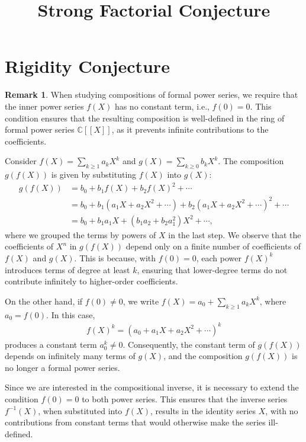 \documentclass[a4paper]{article}
\title{Strong Factorial Conjecture}
\theoremstyle{definition}
\newtheorem*{remark}{Remark}
\begin{document}
\section{Rigidity Conjecture}
\begin{remark}
    When studying compositions of formal power series, we require that the inner power series \(f(X)\) has no constant term, i.e., \(f(0) = 0\). This condition ensures that the resulting composition is well-defined in the ring of formal power series \(\mathbb{C}[[X]]\), as it prevents infinite contributions to the coefficients.

    Consider \(f(X) = \sum_{k \geq 1} a_k X^k\) and \(g(X) = \sum_{k \geq 0} b_k X^k\). The composition \(g(f(X))\) is given by substituting \(f(X)\) into \(g(X)\):
    \begin{align*}
        g(f(X)) &= b_0 + b_1 f(X) + b_2 f(X)^2 + \cdots \\
        &= b_0 + b_1 (a_1 X + a_2 X^2 + \cdots) + b_2 (a_1 X + a_2 X^2 + \cdots)^2 + \cdots \\
        &= b_0 + b_1 a_1 X + (b_1 a_2 + b_2 a_1^2) X^2 + \cdots,
    \end{align*}
    where we grouped the terms by powers of \(X\) in the last step. We observe that the coefficients of \(X^n\) in \(g(f(X))\) depend only on a finite number of coefficients of \(f(X)\) and \(g(X)\). This is because, with \(f(0) = 0\), each power \(f(X)^k\) introduces terms of degree at least \(k\), ensuring that lower-degree terms do not contribute infinitely to higher-order coefficients.

    On the other hand, if \(f(0) \neq 0\), we write \(f(X) = a_0 + \sum_{k \geq 1} a_k X^k\), where \(a_0 = f(0)\). In this case,
    \begin{align*}
        f(X)^k = (a_0 + a_1 X + a_2 X^2 + \cdots)^k
    \end{align*}
    produces a constant term \(a_0^k \neq 0\). Consequently, the constant term of \(g(f(X))\) depends on infinitely many terms of \(g(X)\), and the composition \(g(f(X))\) is no longer a formal power series.

    Since we are interested in the compositional inverse, it is necessary to extend the condition \(f(0) = 0\) to both power series. This ensures that the inverse series \(f^{-1}(X)\), when substituted into \(f(X)\), results in the identity series \(X\), with no contributions from constant terms that would otherwise make the series ill-defined.
\end{remark}
\end{document}
